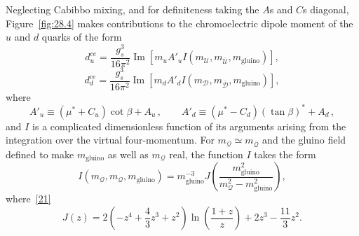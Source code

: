 Neglecting Cabibbo mixing, and for definiteness taking the \(A\)s and
\(C\)s diagonal, Figure~\ref{fig:28.4} makes contributions to the
chromoelectric dipole moment of the \(u\) and \(d\) quarks of the form
\begin{equation}
  d_u^{ce}
  =
  \frac{g_s^3}{16\pi^2}
  \operatorname{Im}\left[
    m_uA'_u
    I(m_{\mathcal{U}},m_{\overline{\mathcal{U}}},
      m_{\mathrm{gluino}})
  \right],
  \tag{28.4.11}\label{eq:28.4.11}
\end{equation}
\begin{equation}
  d_d^{ce}
  =
  \frac{g_s^3}{16\pi^2}
  \operatorname{Im}\left[
    m_dA'_d
    I(m_{\mathcal{D}},m_{\overline{\mathcal{D}}},
      m_{\mathrm{gluino}})
  \right],
  \tag{28.4.12}\label{eq:28.4.12}
\end{equation}
where
\begin{equation}
  A'_u\equiv(\mu^*+C_u)\cot\beta+A_u\,,
  \qquad
  A'_d\equiv(\mu^*-C_d)(\tan\beta)^*+A_d\,,
  \tag{28.4.13}\label{eq:28.4.13}
\end{equation}
and \(I\) is a complicated dimensionless function of its arguments arising
from the integration over the virtual four-momentum. For
\(m_{\mathcal{Q}}\simeq m_{\overline{\mathcal{Q}}}\) and the gluino
field defined to make \(m_{\mathrm{gluino}}\) as well as
\(m_{\mathcal{Q}}\) real, the function \(I\) takes the form
\begin{equation}
  I(m_{\mathcal{Q}},m_{\mathcal{Q}},m_{\mathrm{gluino}})
  =
  m_{\mathrm{gluino}}^{-3}
  J\left(
    \frac{m_{\mathrm{gluino}}^2}
         {m_{\mathcal{Q}}^2-m_{\mathrm{gluino}}^2}
  \right),
  \tag{28.4.14}\label{eq:28.4.14}
\end{equation}
where~\hyperref[ch28-ref-21]{[21]}
\begin{equation}
  J(z)
  =
  2\left(-z^4+\frac43z^3+z^2\right)
    \ln\left(\frac{1+z}{z}\right)
  +2z^3-\frac{11}{3}z^2.
  \tag{28.4.15}\label{eq:28.4.15}
\end{equation}

